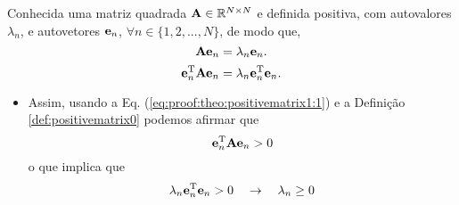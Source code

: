 \begin{myproofT}\label{proof:theo:positivematrix1}
Conhecida uma matriz quadrada $\MATRIX{A} \in \mathbb{R}^{N \times N}$ e definida positiva, com  autovalores $\lambda_n$,
e autovetores $\VECTOR{e}_n$, $\forall n \in \{1, 2, ..., N\}$, de modo que,
\begin{equation}\label{eq:proof:theo:positivematrix1:0}
\MATRIX{A}\VECTOR{e}_n=\lambda_n \VECTOR{e}_n.
\end{equation}
\begin{equation}\label{eq:proof:theo:positivematrix1:1}
\VECTOR{e}_n^{\transpose}\MATRIX{A}\VECTOR{e}_n=\lambda_n \VECTOR{e}_n^{\transpose}\VECTOR{e}_n.
\end{equation}

\begin{itemize}
\item Assim, usando a Eq. (\ref{eq:proof:theo:positivematrix1:1}) e a Definição \ref{def:positivematrix0} podemos afirmar que
\begin{equation}
\VECTOR{e}_n^{\transpose}\MATRIX{A}\VECTOR{e}_n >0
\end{equation} 
o que implica que
\begin{equation}
\lambda_n \VECTOR{e}_n^{\transpose}\VECTOR{e}_n > 0
\quad \rightarrow \quad
\lambda_n  \geq 0
\end{equation} 
\end{itemize}
\end{myproofT}


